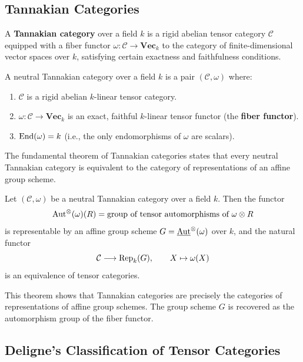 \subsection{Tannakian Categories}

A \textbf{Tannakian category} over a field \(k\) is a rigid abelian tensor category \(\mathcal{C}\) equipped with a fiber functor \(\omega: \mathcal{C} \to \mathbf{Vec}_{k}\) to the category of finite-dimensional vector spaces over \(k\), satisfying certain exactness and faithfulness conditions.

\begin{definition}
A neutral Tannakian category over a field \(k\) is a pair \((\mathcal{C}, \omega)\) where:
\begin{enumerate}
    \item \(\mathcal{C}\) is a rigid abelian \(k\)-linear tensor category.
    \item \(\omega: \mathcal{C} \to \mathbf{Vec}_{k}\) is an exact, faithful \(k\)-linear tensor functor (the \textbf{fiber functor}).
    \item \(\operatorname{End}(\omega) = k\) (i.e., the only endomorphisms of \(\omega\) are scalars).
\end{enumerate}
\end{definition}

The fundamental theorem of Tannakian categories states that every neutral Tannakian category is equivalent to the category of representations of an affine group scheme.

\begin{theorem}
Let \((\mathcal{C}, \omega)\) be a neutral Tannakian category over a field \(k\). Then the functor
\[
\operatorname{Aut}^\otimes(\omega)(R) = \text{group of tensor automorphisms of } \omega \otimes R
\]
is representable by an affine group scheme \(G = \underline{\operatorname{Aut}}^\otimes(\omega)\) over \(k\), and the natural functor
\[
\mathcal{C} \longrightarrow \operatorname{Rep}_k(G), \qquad X \mapsto \omega(X)
\]
is an equivalence of tensor categories.
\end{theorem}

This theorem shows that Tannakian categories are precisely the categories of representations of affine group schemes. The group scheme \(G\) is recovered as the automorphism group of the fiber functor.

\subsection{Deligne's Classification of Tensor Categories}

